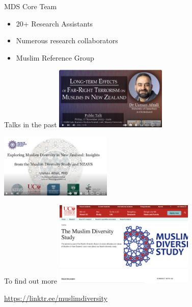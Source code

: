 \documentclass[
  ignorenonframetext,
  aspectratio=169,
]{beamer}
\providecommand{\tightlist}{%
  \setlength{\itemsep}{0pt}\setlength{\parskip}{0pt}}\usepackage{longtable,booktabs,array}
\begin{document}
\begin{frame}{MDS Core Team}
\begin{figure}
\end{figure}%
\end{frame}

\begin{frame}
\begin{itemize}
\tightlist
\item
  20+ Research Assistants
\item
  Numerous research collaborators
\item
  Muslim Reference Group
\end{itemize}
\end{frame}

\begin{frame}{Talks in the past}
\label{talks-in-the-past}
\includegraphics[width=0.4\textwidth,height=\textheight]{figs/care-lecture.png}

\includegraphics[width=0.4\textwidth,height=\textheight]{figs/uc-lecture.png}
\end{frame}

\begin{frame}{To find out more}
\label{to-find-out-more}
\includegraphics[width=0.5\textwidth,height=\textheight]{figs/mds-uc-banner.png}

\url{https://linktr.ee/muslimdiversity}
\end{frame}
\end{document}
